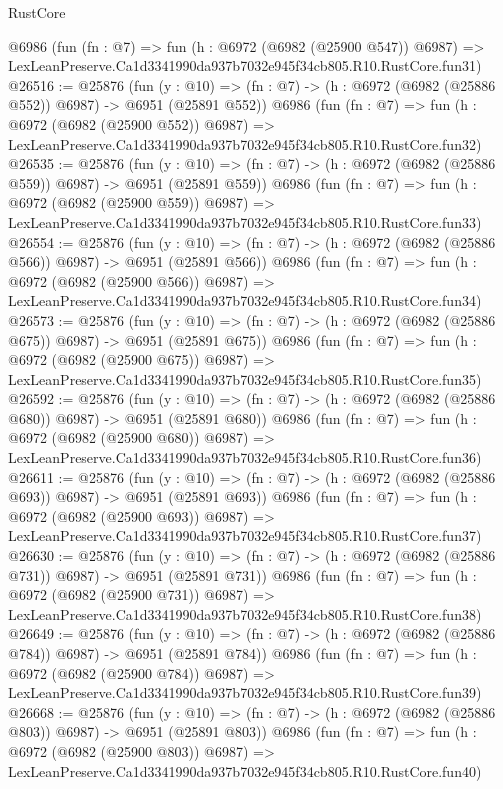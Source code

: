 \begin{lexlean}{RustCore}
\begin{coremodule}
    @6986
    (fun (fn : @7) =>
    fun (h : @6972 (@6982 (@25900 @547)) @6987) =>
    LexLeanPreserve.Ca1d3341990da937b7032e945f34cb805.R10.RustCore.fun31)
@26516 := @25876
    (fun (y : @10) => (fn : @7) -> (h : @6972 (@6982 (@25886 @552)) @6987) -> @6951 (@25891 @552))
    @6986
    (fun (fn : @7) =>
    fun (h : @6972 (@6982 (@25900 @552)) @6987) =>
    LexLeanPreserve.Ca1d3341990da937b7032e945f34cb805.R10.RustCore.fun32)
@26535 := @25876
    (fun (y : @10) => (fn : @7) -> (h : @6972 (@6982 (@25886 @559)) @6987) -> @6951 (@25891 @559))
    @6986
    (fun (fn : @7) =>
    fun (h : @6972 (@6982 (@25900 @559)) @6987) =>
    LexLeanPreserve.Ca1d3341990da937b7032e945f34cb805.R10.RustCore.fun33)
@26554 := @25876
    (fun (y : @10) => (fn : @7) -> (h : @6972 (@6982 (@25886 @566)) @6987) -> @6951 (@25891 @566))
    @6986
    (fun (fn : @7) =>
    fun (h : @6972 (@6982 (@25900 @566)) @6987) =>
    LexLeanPreserve.Ca1d3341990da937b7032e945f34cb805.R10.RustCore.fun34)
@26573 := @25876
    (fun (y : @10) => (fn : @7) -> (h : @6972 (@6982 (@25886 @675)) @6987) -> @6951 (@25891 @675))
    @6986
    (fun (fn : @7) =>
    fun (h : @6972 (@6982 (@25900 @675)) @6987) =>
    LexLeanPreserve.Ca1d3341990da937b7032e945f34cb805.R10.RustCore.fun35)
@26592 := @25876
    (fun (y : @10) => (fn : @7) -> (h : @6972 (@6982 (@25886 @680)) @6987) -> @6951 (@25891 @680))
    @6986
    (fun (fn : @7) =>
    fun (h : @6972 (@6982 (@25900 @680)) @6987) =>
    LexLeanPreserve.Ca1d3341990da937b7032e945f34cb805.R10.RustCore.fun36)
@26611 := @25876
    (fun (y : @10) => (fn : @7) -> (h : @6972 (@6982 (@25886 @693)) @6987) -> @6951 (@25891 @693))
    @6986
    (fun (fn : @7) =>
    fun (h : @6972 (@6982 (@25900 @693)) @6987) =>
    LexLeanPreserve.Ca1d3341990da937b7032e945f34cb805.R10.RustCore.fun37)
@26630 := @25876
    (fun (y : @10) => (fn : @7) -> (h : @6972 (@6982 (@25886 @731)) @6987) -> @6951 (@25891 @731))
    @6986
    (fun (fn : @7) =>
    fun (h : @6972 (@6982 (@25900 @731)) @6987) =>
    LexLeanPreserve.Ca1d3341990da937b7032e945f34cb805.R10.RustCore.fun38)
@26649 := @25876
    (fun (y : @10) => (fn : @7) -> (h : @6972 (@6982 (@25886 @784)) @6987) -> @6951 (@25891 @784))
    @6986
    (fun (fn : @7) =>
    fun (h : @6972 (@6982 (@25900 @784)) @6987) =>
    LexLeanPreserve.Ca1d3341990da937b7032e945f34cb805.R10.RustCore.fun39)
@26668 := @25876
    (fun (y : @10) => (fn : @7) -> (h : @6972 (@6982 (@25886 @803)) @6987) -> @6951 (@25891 @803))
    @6986
    (fun (fn : @7) =>
    fun (h : @6972 (@6982 (@25900 @803)) @6987) =>
    LexLeanPreserve.Ca1d3341990da937b7032e945f34cb805.R10.RustCore.fun40)

\end{coremodule}
\end{lexlean}
